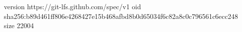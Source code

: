 version https://git-lfs.github.com/spec/v1
oid sha256:b89d461ff806e4268427e15b468afbd8b0d65034f6c82a8c0c796561c6ecc248
size 22004
